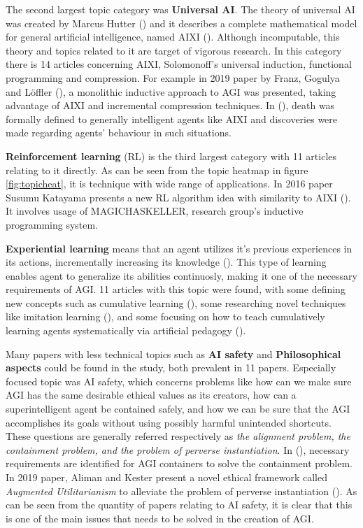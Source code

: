 \documentclass[utf8,english]{gradu3}
\begin{document}
The second largest topic category was \textbf{Universal AI}. The theory of
universal AI was created by Marcus Hutter (\cite*{hutter2004}) and it describes
a complete mathematical model for general artificial intelligence, named AIXI
(\cite{hutter2012decade}). Although incomputable, this theory and topics related
to it are target of vigorous research. In this category there is 14 articles
concerning AIXI, Solomonoff's universal induction, functional programming and
compression. For example in 2019 paper by Franz, Gogulya and Löffler
(\cite*{franz2019william}), a monolithic inductive approach to AGI was
presented, taking advantage of AIXI and incremental compression techniques. In
(\cite{martin2016death}), death was formally defined to generally intelligent
agents like AIXI and discoveries were made regarding agents' behaviour in such
situations.

\textbf{Reinforcement learning} (RL) is the third largest category with 11 articles
relating to it directly. As can be seen from the topic heatmap in figure
\ref{fig:topicheat}, it is technique with wide range of applications. In 2016
paper Susumu Katayama presents a new RL algorithm idea with similarity to AIXI
(\cite{katayama2016ideas}). It involves usage of MAGICHASKELLER, research
group's inductive programming system.

\textbf{Experiential learning} means that an agent utilizes it's previous
experiences in its actions, incrementally increasing its knowledge
(\cite{thorisson2019cumulative}). This type of learning enables agent to
generalize its abilities continuosly, making it one of the necessary
requirements of AGI. 11 articles with this topic were found, with some defining
new concepts such as cumulative learning (\cite{thorisson2019cumulative}), some
researching novel techniques like imitation learning (\cite{katz2016imitation}),
and some focusing on how to teach cumulatively learning agents systematically
via artificial pedagogy (\cite{bieger2017pentagon}).


Many papers with less technical topics such as \textbf{AI safety} and
\textbf{Philosophical aspects} could be found in the study, both prevalent in 11
papers. Especially focused topic was AI safety, which concerns problems like how
can we make sure AGI has the same desirable ethical values as its creators, how
can a superintelligent agent be contained safely, and how we can be sure that
the AGI accomplishes its goals without using possibly harmful unintended
shortcuts. These questions are generally referred respectively as \emph{the
alignment problem, the containment problem, and the problem of perverse
instantiation}. In (\cite{babcock2016containment}), necessary requirements are
identified for AGI containers to solve the containment problem. In 2019 paper,
Aliman and Kester present a novel ethical framework called \emph{Augmented
Utilitarianism} to alleviate the problem of perverse instantiation
(\cite{aliman2019augmented}). As can be seen from the quantity of papers
relating to AI safety, it is clear that this is one of the main issues that
needs to be solved in the creation of AGI.
\end{document}
